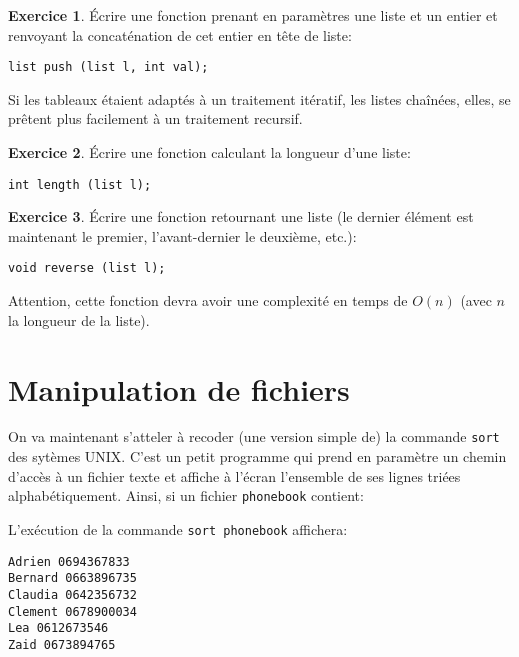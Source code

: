 \documentclass[french,a4paper]{article}
\theoremstyle{definition}
\newtheorem{exercise}{Exercice}
\theoremstyle{remark}
\newcommand{\shell}[1]{\lstinline[style={},style=sh]|#1|}
\begin{document}
\begin{exercise}
  \'Ecrire une fonction prenant en paramètres une liste et un entier
  et renvoyant la concaténation de cet entier en tête de liste:
  \begin{lstlisting}
list push (list l, int val);
  \end{lstlisting}
\end{exercise}

Si les tableaux étaient adaptés à un traitement itératif, les listes
chaînées, elles, se prêtent plus facilement à un traitement recursif.

\begin{exercise}
  \'Ecrire une fonction calculant la longueur d'une liste:
  \begin{lstlisting}
int length (list l);
  \end{lstlisting}
\end{exercise}

\begin{exercise}
  \'Ecrire une fonction retournant une liste (le dernier élément est
  maintenant le premier, l'avant-dernier le deuxième, etc.):
  \begin{lstlisting}
void reverse (list l);
  \end{lstlisting}
  Attention, cette fonction devra avoir une complexité en temps de
  $O(n)$ (avec $n$ la longueur de la liste).
\end{exercise}

\section{Manipulation de fichiers}
\label{sec:sort-unix}

On va maintenant s'atteler à recoder (une version simple de) la
commande \shell{sort} des sytèmes UNIX. C'est un petit programme qui
prend en paramètre un chemin d'accès à un fichier texte et affiche à
l'écran l'ensemble de ses lignes triées alphabétiquement. Ainsi, si un
fichier \shell{phonebook} contient:

L'exécution de la commande \shell{sort phonebook} affichera:
\begin{lstlisting}[style={},style=sh]
Adrien 0694367833
Bernard 0663896735
Claudia 0642356732
Clement 0678900034
Lea 0612673546
Zaid 0673894765
\end{lstlisting}
\end{document}
